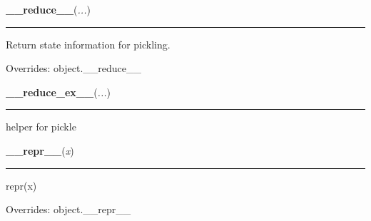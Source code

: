     \vspace{0.5ex}

    \begin{boxedminipage}{\textwidth}

    \raggedright \textbf{\_\_reduce\_\_}(\textit{...})

    \vspace{-1.5ex}

    \rule{\textwidth}{0.5\fboxrule}

Return state information for pickling.
    \vspace{1ex}

      Overrides: object.\_\_reduce\_\_

    \end{boxedminipage}

    \label{object:__reduce_ex__}

    \vspace{0.5ex}

    \begin{boxedminipage}{\textwidth}

    \raggedright \textbf{\_\_reduce\_ex\_\_}(\textit{...})

    \vspace{-1.5ex}

    \rule{\textwidth}{0.5\fboxrule}

helper for pickle
    \vspace{1ex}

    \end{boxedminipage}

    \vspace{0.5ex}

    \begin{boxedminipage}{\textwidth}

    \raggedright \textbf{\_\_repr\_\_}(\textit{x})

    \vspace{-1.5ex}

    \rule{\textwidth}{0.5\fboxrule}

repr(x)
    \vspace{1ex}

      Overrides: object.\_\_repr\_\_

    \end{boxedminipage}

    \label{bitarray:_bitarray:__rmul__}

    \vspace{0.5ex}

